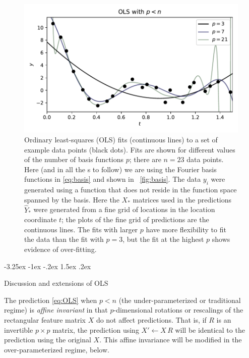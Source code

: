 \documentclass[12pt,letterpaper]{article}
\makeatletter
\newlength{\figurewidth}
\renewcommand\section{\@startsection {section}{1}{\z@}%
  {-3.25ex \@plus -1ex \@minus -.2ex}%
  {1.5ex \@plus .2ex}%
  {\raggedright\normalfont\large\bfseries}}
\makeatother
\begin{document}
\begin{figure}[t]
    \begin{mdframed}
    \includegraphics[width=\figurewidth]{./OLS-under.pdf}
    \caption{Ordinary least-squares (OLS) fits (continuous lines) to a set of example data points (black dots). Fits are shown for different values of the number of basis functions $p$; there are $n=23$ data points. Here (and in all the \figurename s to follow) we are using the Fourier basis functions in \eqref{eq:basis} and shown in \figurename~\ref{fig:basis}. The data $y_i$ were generated using a function that does not reside in the function space spanned by the basis. Here the $X_\ast$ matrices used in the predictions $\hat{Y}_\ast$ were generated from a fine grid of locations in the location coordinate $t$; the plots of the fine grid of predictions are the continuous lines. The fits with larger $p$ have more flexibility to fit the data than the fit with $p=3$, but the fit at the highest $p$ shows evidence of over-fitting.}
    \label{fig:ols1}
    \end{mdframed}
\end{figure}

\section{Discussion and extensions of OLS}\label{sec:extensions}

The prediction \eqref{eq:OLS} when $p<n$ (the under-parameterized or traditional regime) is \emph{affine invariant} in that $p$-dimensional rotations or rescalings of the rectangular feature matrix $X$ do not affect predictions.
That is, if $R$ is an invertible $p\times p$ matrix, the prediction using $X'\leftarrow X\,R$ will be identical to the prediction using the original $X$.
This affine invariance will be modified in the over-parameterized regime, below.
\end{document}
